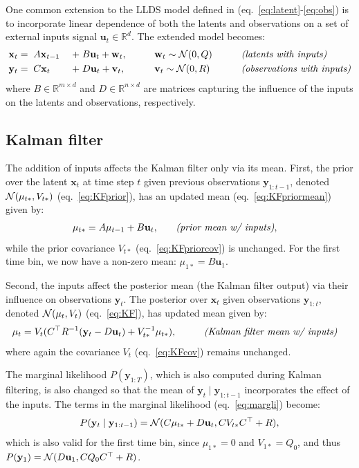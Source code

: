 \documentclass[10pt]{article}
\newcommand{\vx}{\mathbf{x}}
\newcommand{\vw}{\mathbf{w}}
\newcommand{\vy}{\mathbf{y}}
\newcommand{\vv}{\mathbf{v}}
\newcommand{\vu}{\mathbf{u}}
\renewcommand{\RR}{\mathbb{R}}
\begin{document}
\begin{appendices}
One common extension to the LLDS model defined in
(eq.~\ref{eq:latent}-\ref{eq:obs}) is to incorporate linear dependence
of both the latents and observations on a set of external inputs
signal $\vu_t\in \RR^d$.  The extended model becomes:
\begin{alignat}{4}
  \vx_{t} &=\; A \vx_{t-1}\; &+& \;B \vu_{t} + \vw_t, \qquad & &\vw_t \sim \Nrm(0,Q)
  \qquad & & \text{\it(latents with inputs)}\\
  \vy_{t} &=\; C \vx_t &+& \; D \vu_t + \vv_t, \qquad & &\vv_t \sim \Nrm(0,R) 
 \qquad & & \text{\it(observations with inputs)}
\end{alignat}
where $B\in \RR^{m \times d}$ and $D\in \RR^{n\times d}$ are matrices
capturing the influence of the inputs on the latents and observations,
respectively.

\subsection{Kalman filter}

The addition of inputs affects the Kalman filter only via its mean.
First, the prior over the latent $\vx_t$ at time step $t$
given previous observations $\vy_{1:t-1}$,  denoted
$\mathcal{N}(\mu_{t*}, V_{t*})$ (eq.~\ref{eq:KFprior}), has an updated mean (eq.~\ref{eq:KFpriormean})
given by:
\begin{alignat}{2}
  \mu_{t*} &= A \mu_{t-1} + B \vu_t, \quad & & \text{\it (prior mean
    w/ inputs)} \label{eq:KFpriormean2},
\end{alignat}
while the prior covariance $V_{t*}$ (eq.~\ref{eq:KFpriorcov}) is
unchanged.  For the first time bin, we now have a non-zero mean: $\mu_{1*} = B\vu_1$.

Second, the inputs affect the posterior mean (the Kalman
filter output) via their influence on observations $\vy_t$.  The
posterior over $\vx_t$ given observations $\vy_{1:t}$, denoted
$\mathcal{N}(\mu_t, V_t)$ (eq.~\ref{eq:KF}), has updated mean given by:
\begin{alignat}{2}
\mu_{t} &= V_{t}(C\trp R\inv (\vy_{t}-D\vu_t) + V_{t*}\inv \mu_{t*}), \qquad
& & \text{\it (Kalman filter mean w/ inputs)}  \label{eq:KFmean2} 
\end{alignat}
where again the covariance $V_t$ (eq.~\ref{eq:KFcov})  remains unchanged.


The marginal likelihood $P(\vy_{1:T})$, which is also computed during
Kalman filtering, is also changed so that the mean of
$\vy_t \mid \vy_{1:t-1}$ incorporates the effect of the inputs.  The
terms in the marginal likelihood (eq.~\ref{eq:margli}) become:
\begin{equation}
  \label{eq:margliterms2}
  P(\vy_t \mid \vy_{1:t-1}) = \Nrm(C\mu_{t*} + D\vu_t, CV_{t*}C\trp + R),
\end{equation}
which is also valid for the first time bin, since $\mu_{1*} =0$ and
$V_{1*} = Q_0$, and thus $P(\vy_1) = \Nrm(D\vu_1, CQ_0C\trp + R)$.


\end{appendices}
\end{document}

